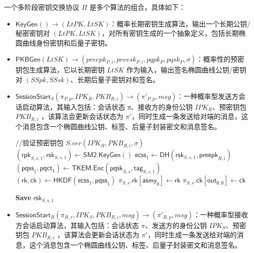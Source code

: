 \begin{definition}[多阶段密钥交换协议]
一个多阶段密钥交换协议 $\Pi$ 是多个算法的组合，具体如下：

\begin{itemize}
  \item $\mathsf{KeyGen}() \rightarrow (LtPK, LtSK)$：概率长期密钥生成算法，输出一个长期公钥/秘密密钥对 $(LtPK, LtSK)$，对所有密钥生成的一个抽象定义，包括长期椭圆曲线身份密钥和后量子密钥。

  \item $\mathsf{PKBGen}(LtSK) \rightarrow (preepk_{P,i},preesk_{P,i},pqpk_{P},pqsk_{P},σ)$：概率性的预密钥包生成算法，它以长期密钥 $LtSK$ 作为输入，输出签名椭圆曲线公钥/密钥对 $(SSpk, SSsk)$、长期后量子密钥对和签名。

  \item $\mathsf{SessionStart}_S (\pi_{P,p}, IPK_R, PKB_{R,i})  \rightarrow (\pi'_{P,p},msg) $：一种概率型发送方会话启动算法，其输入包括：会话状态 π、接收方的身份公钥 $IPK_R$、预密钥包 $PKB_{R,i}$ ，该算法会更新会话状态为 $\pi'$，同时生成一条发送给对端的消息，这个消息包含一个椭圆曲线公钥、标签、后量子封装密文和消息签名。

  \begin{algorithm}[H]
    \caption{$\mathsf{SessionStart_S}(\pi_{S,s}, \mathsf{IPK}_{R}, \mathsf{PKB_{R,i}})$}
    \label{alg:asym_ratchet}
    \begin{algorithmic}[1]
        \State //验证预密钥包
        \State $S.ver(IPK_R,PKB_{R,i},\sigma)$
        \State $(\mathsf{rpk}_{S,s,1}, \mathsf{rsk}_{S,s,1}) \gets \mathsf{SM2}.\mathsf{KeyGen}()$ 
        \State $\mathsf{ecss}_1 \gets \mathsf{DH}(\mathsf{rsk}_{S,s,1}, \mathsf{preepk}_{R,i})$
        \State $(\mathsf{pqss}_1, \mathsf{pqct_1}) \gets \mathsf{TKEM}.\mathsf{Enc}(\mathsf{pqsk}_{S,s},\mathsf{tag}_{S,s,1})$
        \State $(\mathsf{rk}, \mathsf{ck}) \gets \mathsf{HKDF}(\mathsf{ecss}_1, \mathsf{pqss}_1)$
        \State $\pi_{S,s}.\mathsf{rk}[\mathsf{asmy_0}] \gets \mathsf{rk}$ 
        \State $\pi_{S,s}.\mathsf{ck}[\mathsf{out_{0,0}}] \gets \mathsf{ck}$ 
        
        
        \State \textbf{Save} $\mathsf{rsk}_{S,s,1}$ 
    \end{algorithmic}
    \end{algorithm}

  \item $\mathsf{SessionStart}_R  (\pi_{R,r}, IPK_S, PKB_{R,i}, msg)\rightarrow (\pi'_{R,p},msg) $：一种概率型接收方会话启动算法，其输入包括：会话状态 $\pi$、发送方的身份公钥 $IPK_S$、预密钥包 $PKB_{R,i}$ ，该算法会更新会话状态为 $\pi'$，同时生成一条发送给对端的消息，这个消息包含一个椭圆曲线公钥、标签、后量子封装密文和消息签名。


\end{itemize}
\end{definition}
